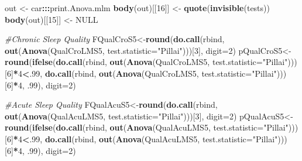 \documentclass[
]{book}
\newenvironment{Shaded}{\begin{snugshade}}{\end{snugshade}}
\newcommand{\CommentTok}[1]{\textcolor[rgb]{0.56,0.35,0.01}{\textit{#1}}}
\newcommand{\DataTypeTok}[1]{\textcolor[rgb]{0.13,0.29,0.53}{#1}}
\newcommand{\DecValTok}[1]{\textcolor[rgb]{0.00,0.00,0.81}{#1}}
\newcommand{\FloatTok}[1]{\textcolor[rgb]{0.00,0.00,0.81}{#1}}
\newcommand{\KeywordTok}[1]{\textcolor[rgb]{0.13,0.29,0.53}{\textbf{#1}}}
\newcommand{\NormalTok}[1]{#1}
\newcommand{\OperatorTok}[1]{\textcolor[rgb]{0.81,0.36,0.00}{\textbf{#1}}}
\newcommand{\OtherTok}[1]{\textcolor[rgb]{0.56,0.35,0.01}{#1}}
\newcommand{\StringTok}[1]{\textcolor[rgb]{0.31,0.60,0.02}{#1}}
\begin{document}
\begin{Shaded}
\begin{Highlighting}[]
\NormalTok{out <-}\StringTok{ }\NormalTok{car}\OperatorTok{:::}\NormalTok{print.Anova.mlm}
\KeywordTok{body}\NormalTok{(out)[[}\DecValTok{16}\NormalTok{]] <-}\StringTok{ }\KeywordTok{quote}\NormalTok{(}\KeywordTok{invisible}\NormalTok{(tests))}
\KeywordTok{body}\NormalTok{(out)[[}\DecValTok{15}\NormalTok{]] <-}\StringTok{ }\OtherTok{NULL}

\CommentTok{#Chronic Sleep Quality}
\NormalTok{FQualCroS5<-}\KeywordTok{round}\NormalTok{(}\KeywordTok{do.call}\NormalTok{(rbind, }\KeywordTok{out}\NormalTok{(}\KeywordTok{Anova}\NormalTok{(QualCroLMS5, }\DataTypeTok{test.statistic=}\StringTok{"Pillai"}\NormalTok{)))[}\DecValTok{3}\NormalTok{], }\DataTypeTok{digit=}\DecValTok{2}\NormalTok{)}
\NormalTok{pQualCroS5<-}\StringTok{  }\KeywordTok{round}\NormalTok{(}\KeywordTok{ifelse}\NormalTok{(}\KeywordTok{do.call}\NormalTok{(rbind, }\KeywordTok{out}\NormalTok{(}\KeywordTok{Anova}\NormalTok{(QualCroLMS5, }\DataTypeTok{test.statistic=}\StringTok{"Pillai"}\NormalTok{)))[}\DecValTok{6}\NormalTok{]}\OperatorTok{*}\DecValTok{4}\OperatorTok{<}\NormalTok{.}\DecValTok{99}\NormalTok{, }\KeywordTok{do.call}\NormalTok{(rbind, }\KeywordTok{out}\NormalTok{(}\KeywordTok{Anova}\NormalTok{(QualCroLMS5, }\DataTypeTok{test.statistic=}\StringTok{"Pillai"}\NormalTok{)))[}\DecValTok{6}\NormalTok{]}\OperatorTok{*}\DecValTok{4}\NormalTok{, }\FloatTok{.99}\NormalTok{), }\DataTypeTok{digit=}\DecValTok{2}\NormalTok{)}

\CommentTok{#Acute Sleep Quality}
\NormalTok{FQualAcuS5<-}\KeywordTok{round}\NormalTok{(}\KeywordTok{do.call}\NormalTok{(rbind, }\KeywordTok{out}\NormalTok{(}\KeywordTok{Anova}\NormalTok{(QualAcuLMS5, }\DataTypeTok{test.statistic=}\StringTok{"Pillai"}\NormalTok{)))[}\DecValTok{3}\NormalTok{], }\DataTypeTok{digit=}\DecValTok{2}\NormalTok{)}
\NormalTok{pQualAcuS5<-}\StringTok{  }\KeywordTok{round}\NormalTok{(}\KeywordTok{ifelse}\NormalTok{(}\KeywordTok{do.call}\NormalTok{(rbind, }\KeywordTok{out}\NormalTok{(}\KeywordTok{Anova}\NormalTok{(QualAcuLMS5, }\DataTypeTok{test.statistic=}\StringTok{"Pillai"}\NormalTok{)))[}\DecValTok{6}\NormalTok{]}\OperatorTok{*}\DecValTok{4}\OperatorTok{<}\NormalTok{.}\DecValTok{99}\NormalTok{, }\KeywordTok{do.call}\NormalTok{(rbind, }\KeywordTok{out}\NormalTok{(}\KeywordTok{Anova}\NormalTok{(QualAcuLMS5, }\DataTypeTok{test.statistic=}\StringTok{"Pillai"}\NormalTok{)))[}\DecValTok{6}\NormalTok{]}\OperatorTok{*}\DecValTok{4}\NormalTok{, }\FloatTok{.99}\NormalTok{), }\DataTypeTok{digit=}\DecValTok{2}\NormalTok{)}


\end{Highlighting}
\end{Shaded}
\end{document}
